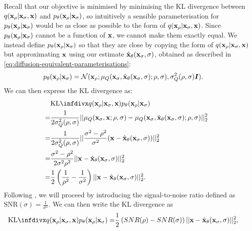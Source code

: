 Recall that our objective is minimised by minimising the KL divergence between $q({\mathbf{x}}_\rho|{\mathbf{x}}_\sigma,{\mathbf{x}})$ and $p_\theta({\mathbf{x}}_{\rho}|{\mathbf{x}}_{\sigma})$, so intuitively a sensible parameterisation for $p_\theta({\mathbf{x}}_\rho|{\mathbf{x}}_\sigma)$ would be as close as possible to the form of $q({\mathbf{x}}_\rho|{\mathbf{x}}_\sigma,{\mathbf{x}})$. Since $p_\theta({\mathbf{x}}_{\rho}|{\mathbf{x}}_{\sigma})$ cannot be a function of ${\mathbf{x}}$, we cannot make them exactly equal. We instead define $p_\theta({\mathbf{x}}_\rho|{\mathbf{x}}_\sigma)$ so that they are close by copying the form of $q({\mathbf{x}}_\rho|{\mathbf{x}}_\sigma,{\mathbf{x}})$ but approximating ${\mathbf{x}}$ using our estimate $\hat{{\mathbf{x}}}_\theta({\mathbf{x}}_\sigma, \sigma)$, obtained as described in \cref{eq:diffusion-equivalent-parameterisations}:
\begin{align}
    p_\theta({\mathbf{x}}_{\rho} | {\mathbf{x}}_{\sigma}) &= {\mathcal{N}}( {\mathbf{x}}_{\rho}; \mathbf{\mu}_Q({\mathbf{x}}_\sigma, \hat{{\mathbf{x}}}_\theta({\mathbf{x}}_\sigma, \sigma); \rho, \sigma), \sigma_Q^2(\rho, \sigma) {\bm{I}} ).
\end{align}
We can then express the KL divergence as:
\begin{align}
    &\kl{q(\rvx_{\rho} | \rvx_{\sigma}, \rvx)}{p_\theta(\rvx_{\rho} | \rvx_{\sigma})} \\ 
    = &\frac{1}{2 \sigma_Q^2(\rho, \sigma)} || \mathbf{\mu}_Q(\rvx_\sigma, \rvx; \rho, \sigma) - \mathbf{\mu}_Q(\rvx_\sigma, \hat{\rvx}_\theta(\rvx_\sigma, \sigma); \rho, \sigma) ||_2^2 \\
    = &\frac{1}{2 \sigma_Q^2(\rho, \sigma)} || \frac{\sigma^2-\rho^2}{\sigma^2} ( \rvx - \hat{\rvx}_\theta(\rvx_\sigma, \sigma) ) ||_2^2 \\
    = &\frac{\sigma^2-\rho^2}{2 \sigma^2 \rho^2} || \rvx - \hat{\rvx}_\theta(\rvx_\sigma, \sigma) ||_2^2 \\
    = &\frac{1}{2} \left( \frac{1}{\rho^2} - \frac{1}{\sigma^2} \right) || \rvx - \hat{\rvx}_\theta(\rvx_\sigma, \sigma) ||_2^2.
\end{align}
Following \citet{kingma2021variational}, we will proceed by introducing the signal-to-noise ratio defined as $\text{SNR}(\sigma) = \frac{1}{\sigma^2}$. We can then write the KL divergence as
\begin{align}
\kl{q(\rvx_{\rho} | \rvx_{\sigma}, \rvx)}{p_\theta(\rvx_{\rho} | \rvx_{\sigma})} = &\frac{1}{2} \left( SNR(\rho) - SNR(\sigma) \right) || \rvx - \hat{\rvx}_\theta(\rvx_\sigma, \sigma) ||_2^2,
\end{align}
